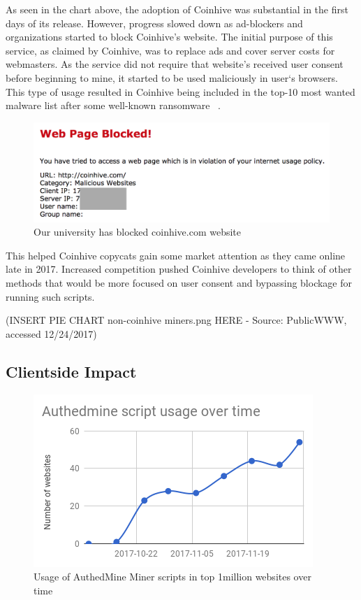 As seen in the chart above, the adoption of Coinhive was substantial in the first days of its release. However, progress slowed down as ad-blockers and organizations started to block Coinhive's website. The initial purpose of this service, as claimed by Coinhive, was to replace ads and cover server costs for webmasters. As the service did not require that website's received user consent before beginning to mine, it started to be used maliciously in user`s browsers. This type of usage resulted in Coinhive being included in the top-10 most wanted malware list after some well-known ransomware ~\cite{checkpoint}. 

\begin{figure}[t]
\centering
\includegraphics[width=\linewidth]{figures/coinhive_blocked.png}
\caption{Our university has blocked coinhive.com website}
\end{figure}


This helped Coinhive copycats gain some market attention as they came online late in 2017.
Increased competition pushed Coinhive developers to think of other methods that would be more focused on user consent and bypassing blockage for running such scripts.

(INSERT PIE CHART non-coinhive miners.png HERE - Source: PublicWWW, accessed 12/24/2017)


\subsection{Clientside Impact}

\begin{figure}[t]
\centering
\includegraphics[width=\linewidth]{figures/usage_of_authedmine_over_time.png}
	\caption{Usage of AuthedMine Miner scripts in top 1million websites over time}
\end{figure}

